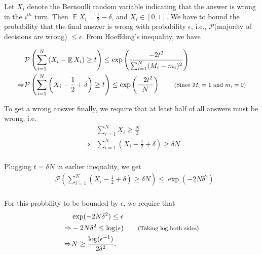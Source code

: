 \documentclass[11pt]{article}
\newenvironment{exercise}[2][Exercise]{\begin{trivlist}
\item[\hskip \labelsep {\bfseries #1}\hskip \labelsep {\bfseries #2.}]}{\end{trivlist}}
\newenvironment{solution}[1][Solution]{\begin{trivlist}
\item[\hskip \labelsep {\bfseries #1}\hskip \labelsep]}{\end{trivlist}}
\DeclareMathOperator*{\E}{\mathbb{E}}
\newcommand*{\annot}[1]{\tag*{\footnotesize{(#1)}}}
\begin{document}
\begin{solution}
Let $X_i$ denote the Bernoulli random variable indicating that the answer is wrong in the $i^{th}$ turn. Then $\E X_i = \frac{1}{2} - \delta$, and $X_i \in [0,1]$. We have to bound the probability that the final answer is wrong with probability $\epsilon$, i.e., $\mathcal{P}$(majority of decisions are wrong) $\leq \epsilon$. From Hoeffding's inequality, we have

\begin{align*}
& \mathcal{P}\left( \sum_{i=1}^N \left( X_i - \E X_i \right) \geq t \right) \leq \exp \left( \frac{-2t^2}{\sum_{i=1}^N (M_i - m_i)^2} \right) \\
\Rightarrow & \mathcal{P}\left( \sum_{i=1}^N \left( X_i - \frac{1}{2} + \delta \right) \geq t \right) \leq \exp \left( \frac{-2t^2}{N} \right) \annot{Since $M_i = 1$ and $m_i = 0$} \\
\end{align*}

To get a wrong answer finally, we require that at least half of all answers must be wrong, i.e. 
\begin{align*}
& \sum_{i=1}^N X_i \geq \frac{N}{2} \\
\Rightarrow & \sum_{i=1}^N \left( X_i - \frac{1}{2} + \delta \right) \geq \delta N \\ 
\end{align*}

Plugging $t = \delta N$ in earlier inequality, we get
\begin{align*}
& \mathcal{P}\left( \sum_{i=1}^N \left( X_i - \frac{1}{2} + \delta \right) \geq \delta N \right) \leq \exp \left( -2N \delta^2 \right)\\
\end{align*}

For this probbility to be bounded by $\epsilon$, we require that
\begin{align*}
& \exp(-2 N \delta^2) \leq \epsilon \\
\Rightarrow & -2 N \delta^2 \leq \log (\epsilon) \annot{Taking log both sides} \\
\Rightarrow & N \geq \frac{\log(\epsilon^{-1})}{2\delta^2}.\\
\end{align*}
\end{solution}

\begin{exercise}{2.2.9}
\end{exercise}
\end{document}
